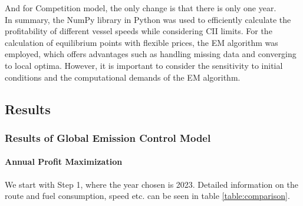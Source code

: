 \documentclass[a4paper,12pt]{article}
\begin{document}
And for Competition model, the only change is that there is only one year.\\

In summary, the NumPy library in Python was used to efficiently calculate the profitability of different vessel speeds while considering CII limits.
For the calculation of equilibrium points with flexible prices, the EM algorithm was employed, which offers advantages such as handling missing data and converging to local optima.
However, it is important to consider the sensitivity to initial conditions and the computational demands of the EM algorithm.\\







\subsection{Results}
\subsubsection{Results of Global Emission Control Model}
\paragraph{Annual Profit Maximization}
We start with Step 1, where the year chosen is 2023. Detailed information on the route and fuel consumption, speed etc. can be seen in table \ref{table:comparison}.
\end{document}
